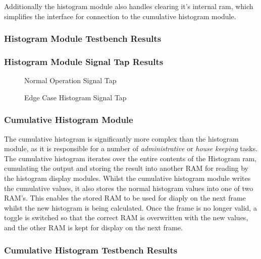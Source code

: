 \documentclass[12pt]{article}
\begin{document}
  Additionally the histogram module also handles clearing it's internal ram, which simplifies the interface for connection to the cumulative histogram module.
  
  \subsubsection{Histogram Module Testbench Results}
  
  \subsubsection{Histogram Module Signal Tap Results}
    \begin{figure}[H]
    \caption{Normal Operation Signal Tap}
    \label{fig:histogram_signal_tap_normal_operation}
  \end{figure}
   \begin{figure}[H]
    \caption{Edge Case Histogram Signal Tap}
    \label{fig:histogram_signal_tap_edge_case_operation}
  \end{figure}
  \subsubsection{Cumulative Histogram Module}
  The cumulative histogram is significantly more complex than the histogram module, as it is responsible for a number of \textit{administrative} or \textit{house keeping} tasks. The cumulative histogram iterates over the entire contents of the Histogram ram, cumulating the output and storing the result into another RAM for reading by the histogram display modules. Whilst the cumulative histogram module writes the cumulative values, it also stores the normal histogram values into one of two RAM's. This enables the stored RAM to be used for diaply on the next frame whilst the new histogram is being calculated. Once the frame is no longer valid, a toggle is switched so that the correct RAM is overwritten with the new values, and the other RAM is kept for display on the next frame.

  \subsubsection{Cumulative Histogram Testbench Results}
\end{document}
